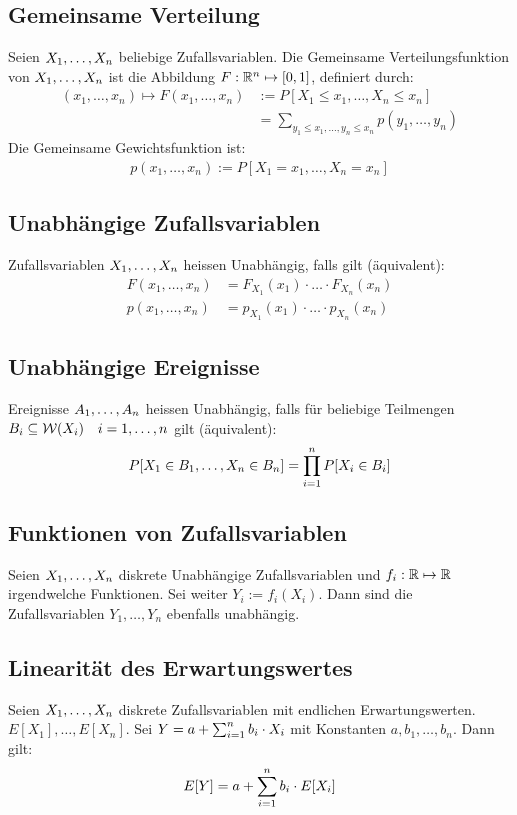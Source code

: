 \subsection*{Gemeinsame Verteilung}
Seien $X_1, \dots, X_n$ beliebige Zufallsvariablen. Die Gemeinsame
Verteilungsfunktion von $X_1, \dots, X_n$ ist die Abbildung $F: \mathbb{R}^n \mapsto
  [0, 1]$, definiert durch:
\begin{align*}
  (x_1, \dots, x_n) \mapsto F (x_1, \dots, x_n) & := P[X_1 \leq x_1, \dots, X_n \leq x_n]                        \\
                                                & = \sum_{y_1 \leq x_1, \dots, y_n \leq x_n} p (y_1, \dots, y_n)
\end{align*}
Die Gemeinsame Gewichtsfunktion ist:
\begin{align*}
  p (x_1, \dots, x_n) := P[X_1 = x_1, \dots, X_n = x_n]
\end{align*}

\subsection*{Unabhängige Zufallsvariablen}
Zufallsvariablen $X_1, \dots, X_n$ heissen Unabhängig, falls gilt
(äquivalent):
\begin{align*}
  F (x_1, \dots, x_n) & = F_{X_1} (x_1) \cdot \hdots \cdot F_{X_n} (x_n) \\
  p (x_1, \dots, x_n) & = p_{X_1} (x_1) \cdot \hdots \cdot p_{X_n} (x_n)
\end{align*}
\subsection*{Unabhängige Ereignisse}
Ereignisse $A_1, \dots, A_n$ heissen Unabhängig, falls für beliebige Teilmengen
$B_i \subseteq \mathcal{W} (X_i) \quad i = 1, \dots, n$ gilt (äquivalent):
\begin{align*}
  P[X_1 \in B_1, \dots, X_n \in B_n] = \prod_{i = 1}^n P[X_i \in B_i]
\end{align*}
\subsection*{Funktionen von Zufallsvariablen}
Seien $X_1, \dots, X_n$ diskrete Unabhängige Zufallsvariablen und $f_i: \mathbb{R}
  \mapsto \mathbb{R}$ irgendwelche Funktionen. Sei weiter $Y_i := f_i (X_i)$. Dann sind
die Zufallsvariablen $Y_1, \dots, Y_n$ ebenfalls unabhängig.
\subsection*{Linearität des Erwartungswertes}
Seien $X_1, \dots, X_n$ diskrete Zufallsvariablen mit endlichen
Erwartungswerten. $E[X_1], \dots, E[X_n]$. Sei $Y = a + \sum_{i = 1}^n b_i \cdot X_i$ mit
Konstanten $a, b_1, \dots, b_n$. Dann gilt:
\begin{align*}
  E[Y] = a + \sum_{i = 1}^n b_i \cdot E[X_i]
\end{align*}
